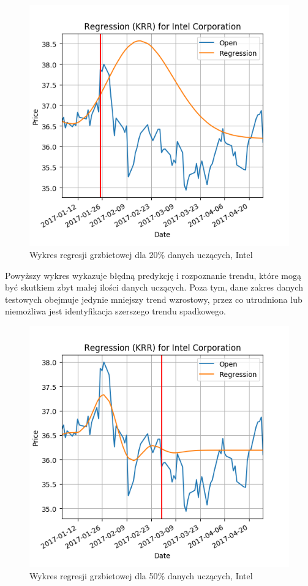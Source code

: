 \begin{figure}[h!]
\centering
\includegraphics[width=150mm]{pictures/plots/intel_krr_20.png}
\caption{Wykres regresji grzbietowej dla 20\% danych uczących, Intel}
\label{fig:intel_krr_20}
\end{figure}

Powyższy wykres wykazuje błędną predykcję i rozpoznanie trendu, które mogą być skutkiem zbyt małej ilości danych uczących.
Poza tym, dane zakres danych testowych obejmuje jedynie mniejszy trend wzrostowy, przez co utrudniona lub niemożliwa jest identyfikacja szerszego trendu spadkowego.\\

\begin{figure}[h!]
\centering
\includegraphics[width=150mm]{pictures/plots/intel_krr_50.png}
\caption{Wykres regresji grzbietowej dla 50\% danych uczących, Intel}
\label{fig:intel_krr_50}
\end{figure}

